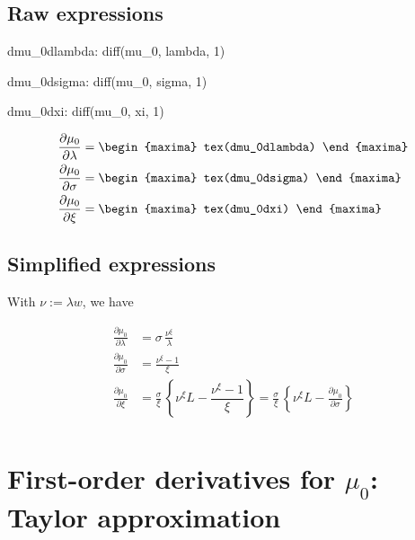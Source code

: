 \subsection*{Raw expressions}

\begin{maxima}
  dmu_0dlambda: diff(mu_0, lambda, 1)
\end{maxima}
\begin{maxima}
  dmu_0dsigma: diff(mu_0, sigma, 1)
\end{maxima}
\begin{maxima}
  dmu_0dxi: diff(mu_0, xi, 1)
\end{maxima}

{\color{MonVertF}
\begin{align*}
  \frac{\partial \mu_0}{\partial \lambda}
  &=
\begin{maxima}
  tex(dmu_0dlambda)
\end{maxima}\\
 \frac{\partial \mu_0}{\partial \sigma}
  &=
\begin{maxima}
  tex(dmu_0dsigma)
\end{maxima}\\
\frac{\partial \mu_0 }{\partial \xi}
  &=
\begin{maxima}
  tex(dmu_0dxi)
\end{maxima}
\end{align*}
}

\subsection*{Simplified expressions}
With $\nu := \lambda w$, we have

{\color{red}
\begin{align*}
  \frac{\partial \mu_0}{\partial \lambda}
  &= \sigma \, \frac{\nu^\xi}{\lambda}\\
 \frac{\partial \mu_0}{\partial \sigma}
  &= \frac{\nu^\xi-1}{\xi}\\
\frac{\partial \mu_0 }{\partial \xi}
  &= \frac{\sigma}{\xi} \, \left\{\nu^\xi L - \dfrac{\nu^\xi - 1}{\xi} \right\} =
  \frac{\sigma}{\xi} \, \left\{\nu^\xi L - \frac{\partial \mu_0}{\partial \sigma} \right\} \\
\end{align*}
}
\section{First-order derivatives for $\mu_0$: Taylor approximation}

